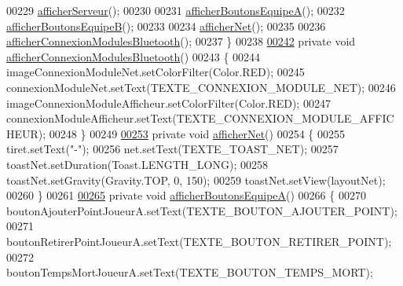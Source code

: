 \begin{DoxyCode}
00229         \hyperlink{classcom_1_1example_1_1area_1_1_i_h_m_gestion_partie_adf8fc8de224da80f542675cbb4c2e364}{afficherServeur}();
00230 
00231         \hyperlink{classcom_1_1example_1_1area_1_1_i_h_m_gestion_partie_a6c63ebbc9822ef53f43468d100ab5677}{afficherBoutonsEquipeA}();
00232         \hyperlink{classcom_1_1example_1_1area_1_1_i_h_m_gestion_partie_a00c0111f1b2d4d1161515e2c04ca645c}{afficherBoutonsEquipeB}();
00233 
00234         \hyperlink{classcom_1_1example_1_1area_1_1_i_h_m_gestion_partie_a1892c3b33ec5d93514dfa8e30f61204d}{afficherNet}();
00235 
00236         \hyperlink{classcom_1_1example_1_1area_1_1_i_h_m_gestion_partie_ade4de81cd6978057a06e16e2e577180c}{afficherConnexionModulesBluetooth}();
00237     \}
00238 
\hyperlink{classcom_1_1example_1_1area_1_1_i_h_m_gestion_partie_ade4de81cd6978057a06e16e2e577180c}{00242}     \textcolor{keyword}{private} \textcolor{keywordtype}{void} \hyperlink{classcom_1_1example_1_1area_1_1_i_h_m_gestion_partie_ade4de81cd6978057a06e16e2e577180c}{afficherConnexionModulesBluetooth}()
00243     \{
00244         imageConnexionModuleNet.setColorFilter(Color.RED);
00245         connexionModuleNet.setText(TEXTE\_CONNEXION\_MODULE\_NET);
00246         imageConnexionModuleAfficheur.setColorFilter(Color.RED);
00247         connexionModuleAfficheur.setText(TEXTE\_CONNEXION\_MODULE\_AFFICHEUR);
00248     \}
00249 
\hyperlink{classcom_1_1example_1_1area_1_1_i_h_m_gestion_partie_a1892c3b33ec5d93514dfa8e30f61204d}{00253}     \textcolor{keyword}{private} \textcolor{keywordtype}{void} \hyperlink{classcom_1_1example_1_1area_1_1_i_h_m_gestion_partie_a1892c3b33ec5d93514dfa8e30f61204d}{afficherNet}()
00254     \{
00255         tiret.setText(\textcolor{stringliteral}{"-"});
00256         net.setText(TEXTE\_TOAST\_NET);
00257         toastNet.setDuration(Toast.LENGTH\_LONG);
00258         toastNet.setGravity(Gravity.TOP, 0, 150);
00259         toastNet.setView(layoutNet);
00260     \}
00261 
\hyperlink{classcom_1_1example_1_1area_1_1_i_h_m_gestion_partie_a6c63ebbc9822ef53f43468d100ab5677}{00265}     \textcolor{keyword}{private} \textcolor{keywordtype}{void} \hyperlink{classcom_1_1example_1_1area_1_1_i_h_m_gestion_partie_a6c63ebbc9822ef53f43468d100ab5677}{afficherBoutonsEquipeA}()
00266     \{
00270         boutonAjouterPointJoueurA.setText(TEXTE\_BOUTON\_AJOUTER\_POINT);
00271         boutonRetirerPointJoueurA.setText(TEXTE\_BOUTON\_RETIRER\_POINT);
00272         boutonTempsMortJoueurA.setText(TEXTE\_BOUTON\_TEMPS\_MORT);

\end{DoxyCode}

